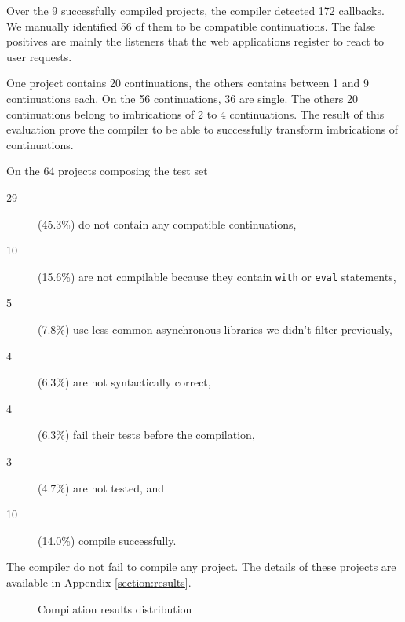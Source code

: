 Over the 9 successfully compiled projects, the compiler detected 172 callbacks.
We manually identified 56 of them to be compatible continuations.
The false positives are mainly the listeners that the web applications register to react to user requests.

One project contains 20 continuations, the others contains between 1 and 9 continuations each.
On the 56 continuations, 36 are single. %
The others 20 continuations belong to imbrications of 2 to 4 continuations.
The result of this evaluation prove the compiler to be able to successfully transform imbrications of continuations.

On the 64 projects composing the test set
\begin{description}
\item[29] (45.3\%) do not contain any compatible continuations,
\item[10] (15.6\%) are not compilable because they contain \texttt{with} or \texttt{eval} statements,
\item[5] (7.8\%) use less common asynchronous libraries we didn't filter previously,
\item[4] (6.3\%) are not syntactically correct,
\item[4] (6.3\%) fail their tests before the compilation,
\item[3] (4.7\%) are not tested, and
\item[10] (14.0\%) compile successfully.
\end{description}
The compiler do not fail to compile any project.
The details of these projects are available in Appendix \ref{section:results}.

\begin{figure}[h!]
\caption{Compilation results distribution}
\end{figure}























